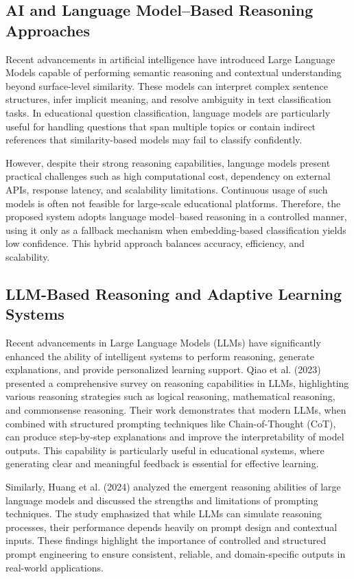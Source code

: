 \begin{sloppypar}
\subsection{AI and Language Model--Based Reasoning Approaches}

Recent advancements in artificial intelligence have introduced Large Language Models capable of performing semantic reasoning and contextual understanding beyond surface-level similarity. These models can interpret complex sentence structures, infer implicit meaning, and resolve ambiguity in text classification tasks. In educational question classification, language models are particularly useful for handling questions that span multiple topics or contain indirect references that similarity-based models may fail to classify confidently.

However, despite their strong reasoning capabilities, language models present practical challenges such as high computational cost, dependency on external APIs, response latency, and scalability limitations. Continuous usage of such models is often not feasible for large-scale educational platforms. Therefore, the proposed system adopts language model--based reasoning in a controlled manner, using it only as a fallback mechanism when embedding-based classification yields low confidence. This hybrid approach balances accuracy, efficiency, and scalability.

\subsection{LLM-Based Reasoning and Adaptive Learning Systems}

Recent advancements in Large Language Models (LLMs) have significantly enhanced the ability of intelligent systems to perform reasoning, generate explanations, and provide personalized learning support. Qiao et al. (2023) \cite{qiao2023survey} presented a comprehensive survey on reasoning capabilities in LLMs, highlighting various reasoning strategies such as logical reasoning, mathematical reasoning, and commonsense reasoning. Their work demonstrates that modern LLMs, when combined with structured prompting techniques like Chain-of-Thought (CoT), can produce step-by-step explanations and improve the interpretability of model outputs. This capability is particularly useful in educational systems, where generating clear and meaningful feedback is essential for effective learning.

Similarly, Huang et al. (2024) \cite{huang2024reasoning} analyzed the emergent reasoning abilities of large language models and discussed the strengths and limitations of prompting techniques. The study emphasized that while LLMs can simulate reasoning processes, their performance depends heavily on prompt design and contextual inputs. These findings highlight the importance of controlled and structured prompt engineering to ensure consistent, reliable, and domain-specific outputs in real-world applications.


\end{sloppypar}
